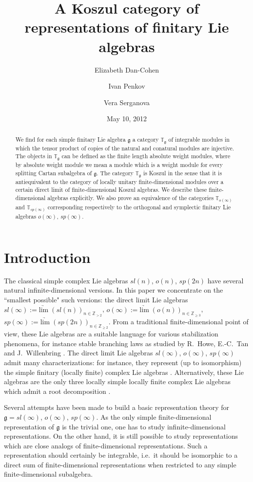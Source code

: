 \documentclass{amsart}
\author{Elizabeth Dan-Cohen}
\author{Ivan Penkov}
\author{Vera Serganova}
\title{A Koszul category of representations of finitary Lie algebras}
\date{May 10, 2012}
\renewcommand{\sl}{sl}
\newcommand{\so}{o}
\newcommand{\T}{\mathbb T}
\newcommand{\Tg}{\mathbb T_{\mathfrak g}}
\renewcommand{\sp}{sp}
\renewcommand{\gg}{\mathfrak{g}}
\newcommand{\limarr}{\underrightarrow{\mathrm{lim}} \;}
\theoremstyle{definition}
\numberwithin{equation}{section}
\begin{document}
\begin{abstract}
We find for each simple finitary Lie algebra $\gg$ a category $\Tg$ of integrable modules in which the tensor product of copies of the natural and conatural modules are injective.  The objects in $\Tg$ can be defined as the finite length absolute weight modules, where by absolute weight module we mean a module which is a weight module for every splitting Cartan subalgebra of $\gg$.  The category $\Tg$ is Koszul in the sense that it is antiequivalent to the category of locally unitary finite-dimensional modules over a certain direct limit of finite-dimensional Koszul algebras.  We describe these finite-dimensional algebras explicitly.  We also prove an equivalence of the categories $\T_{\so(\infty)}$ and $\T_{\sp(\infty)}$ corresponding respectively to the orthogonal and symplectic finitary Lie algebras $\so(\infty)$, $\sp(\infty)$.
\end{abstract}

\maketitle


\section{Introduction}

The classical simple complex Lie algebras $\sl(n)$, $\so(n)$, $\sp(2n)$ have several natural infinite-dimensional versions. In this paper we concentrate on the ``smallest possible" such versions: the direct limit Lie algebras $\sl(\infty):=\limarr (\sl(n))_{n\in\mathbb{Z}_{>2}}$, $\so(\infty):=\limarr ( \so(n))_{n\in\mathbb{Z}_{\geq 3}}$, $\sp(\infty):=\limarr (\sp(2n))_{n\in\mathbb{Z}_{\geq 2}}$. 
 From a traditional finite-dimensional point of view, these Lie algebras are a suitable language for various stabilization phenomena, for instance stable branching laws as studied by R.~Howe, E.-C.~Tan and J.~Willenbring \cite{HTW}. The direct limit Lie algebras $\sl(\infty)$, $\so(\infty)$, $\sp(\infty)$ admit many characterizations: for instance, they represent (up to isomorphism) the simple finitary (locally finite) complex Lie algebras \cite{B, BSt}.  Alternatively, these Lie algebras are the only three locally simple locally finite complex Lie algebras which admit a root decomposition \cite{PStr}.

Several attempts have been made to build a basic representation
theory for $\gg=\sl(\infty)$, $\so(\infty)$, $\sp(\infty)$. 
As the only simple finite-dimensional representation of $\gg$ is the
trivial one, one has to study infinite-dimensional
representations. On the other hand, it is still possible to study
representations which are close analogs of finite-dimensional
representations.
Such a representation should certainly be integrable, i.e.\ it should
be isomorphic to a direct sum of finite-dimensional representations
when restricted to any simple finite-dimensional subalgebra. 
\end{document}
